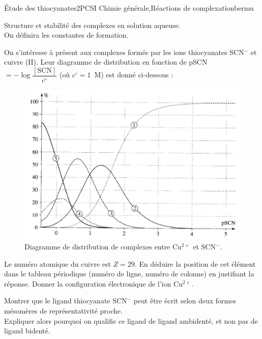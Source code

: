 
\begin{exercise}{\'Etude des thiocyanates}{2}{PCSI}
{Chimie générale,Réactions de complexation}{bermu}

\begin{questions}
\questioncours Structure et stabilité des complexes en solution aqueuse. \\ On définira les constantes de formation.

\begin{EnvUplevel}
    On s'intéresse à présent aux complexes formés par les ions thiocyanates SCN$^{-}$ et cuivre (II). Leur diagramme de distribution en fonction de pSCN $=-\log\dfrac{\mathrm{[SCN]}}{c^\circ}$ (où $c^\circ = 1$~M) est donné ci-dessous : \vspace{-.5em}
    
    \begin{figure}[H]
        \centering
        \includegraphics[width=.9\linewidth]{chimiePC/gene/thio.jpg}\vspace{-1.3em}
        \caption{Diagramme de distribution de complexes entre Cu$^{2+}$ et SCN$^{-}$.} \vspace{-0.8em}
    \end{figure}
\end{EnvUplevel}

\question Le numéro atomique du cuivre est $Z = 29$. En déduire la position de cet élément dans le tableau périodique (numéro de ligne, numéro de colonne) en justifiant la réponse. Donner la configuration électronique de l’ion Cu$^{2+}$.

\question Montrer que le ligand thiocyanate SCN$^{-}$ peut être écrit selon deux formes mésomères de représentativité proche. \\
Expliquer alors pourquoi on qualifie ce ligand de ligand ambidenté, et non pas de ligand bidenté.


\end{questions}
\end{exercise}
